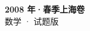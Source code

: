 \documentclass[zihao=-4, a4paper]{ctexart}
\begin{document}
\begin{center}
  {\Large\bfseries 2008 年·春季上海卷}\\[4pt]
  {\large 数学 · 试题版}
\end{center}
\medskip
{}

\end{document}
